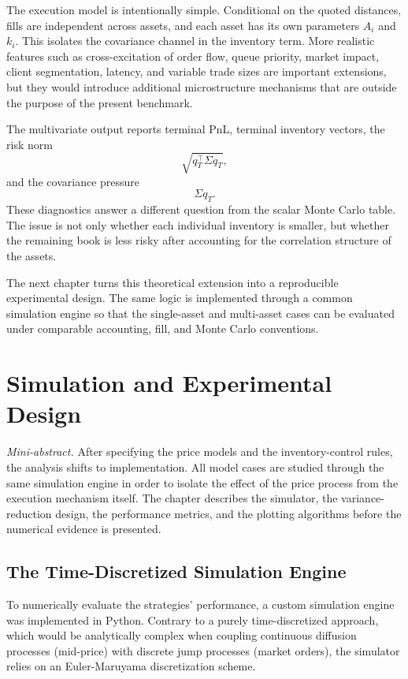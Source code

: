 \documentclass[a4paper,10pt,titlepage,oneside,openany]{book}
\theoremstyle{plain}\newtheorem{theorem}{Theorem}[chapter]
\theoremstyle{definition}\newtheorem{definition}{Definition}[chapter]
\theoremstyle{remark}\newtheorem{remark}{Remark}[chapter]
\newcommand{\miniabstract}[1]{%
\vspace{-2pt}
\begin{tcolorbox}[colback=gray!6,colframe=black!15,boxrule=0.3pt,arc=3pt,left=6pt,right=6pt,top=4pt,bottom=4pt]
\textit{Mini-abstract.} #1
\end{tcolorbox}
\vspace{-4pt}
}
\begin{document}
The execution model is intentionally simple. Conditional on the quoted distances, fills are independent across assets, and each asset has its own parameters $A_i$ and $k_i$. This isolates the covariance channel in the inventory term. More realistic features such as cross-excitation of order flow, queue priority, market impact, client segmentation, latency, and variable trade sizes are important extensions, but they would introduce additional microstructure mechanisms that are outside the purpose of the present benchmark.

The multivariate output reports terminal PnL, terminal inventory vectors, the risk norm
\[
\sqrt{q_T^\top\Sigma q_T},
\]
and the covariance pressure
\[
\Sigma q_T.
\]
These diagnostics answer a different question from the scalar Monte Carlo table. The issue is not only whether each individual inventory is smaller, but whether the remaining book is less risky after accounting for the correlation structure of the assets.

The next chapter turns this theoretical extension into a reproducible experimental design. The same logic is implemented through a common simulation engine so that the single-asset and multi-asset cases can be evaluated under comparable accounting, fill, and Monte Carlo conventions.

\chapter{Simulation and Experimental Design}
\miniabstract{After specifying the price models and the inventory-control rules, the analysis shifts to implementation. All model cases are studied through the same simulation engine in order to isolate the effect of the price process from the execution mechanism itself. The chapter describes the simulator, the variance-reduction design, the performance metrics, and the plotting algorithms before the numerical evidence is presented.}

\section{The Time-Discretized Simulation Engine}
To numerically evaluate the strategies' performance, a custom simulation engine was implemented in Python. Contrary to a purely time-discretized approach, which would be analytically complex when coupling continuous diffusion processes (mid-price) with discrete jump processes (market orders), the simulator relies on an Euler-Maruyama discretization scheme.
\end{document}
